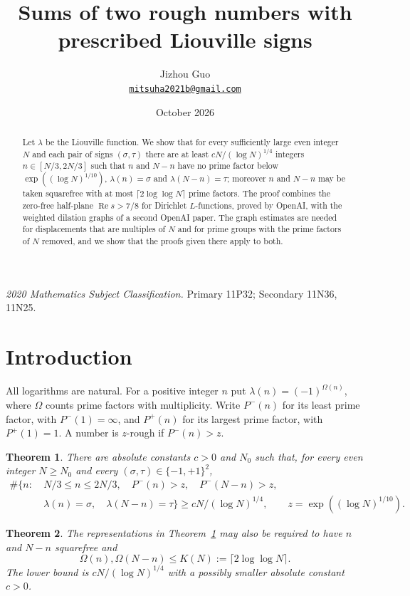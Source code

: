 \documentclass[11pt]{article}
\title{Sums of two rough numbers with prescribed Liouville signs}
\author{Jizhou Guo\\
  \href{mailto:mitsuha2021b@gmail.com}{\texttt{mitsuha2021b@gmail.com}}}
\date{October 2026}
\newtheorem{theorem}{Theorem}[section]
\theoremstyle{definition}
\theoremstyle{remark}
\begin{document}
\maketitle
\begin{abstract}
Let $\lambda$ be the Liouville function. We show that for every sufficiently large even integer $N$ and
each pair of signs $(\sigma,\tau)$ there are at least $cN/(\log N)^{1/4}$ integers $n\in[N/3,2N/3]$
such that $n$ and $N-n$ have no prime factor below $\exp((\log N)^{1/10})$, $\lambda(n)=\sigma$ and
$\lambda(N-n)=\tau$; moreover $n$ and $N-n$ may be taken squarefree with at most
$\lceil 2\log\log N\rceil$ prime factors. The proof combines the zero-free half-plane
$\operatorname{Re}s>7/8$ for Dirichlet $L$-functions, proved by OpenAI, with the weighted dilation
graphs of a second OpenAI paper. The graph estimates are needed for displacements that are multiples of
$N$ and for prime groups with the prime factors of $N$ removed, and we show that the proofs given
there apply to both.
\end{abstract}
\noindent\textit{2020 Mathematics Subject Classification.} Primary 11P32; Secondary 11N36, 11N25.

\section{Introduction}\label{sec:intro}
All logarithms are natural. For a positive integer $n$ put
$\lambda(n)=(-1)^{\Omega(n)}$, where $\Omega$ counts prime factors with
multiplicity. Write $P^-(n)$ for its least prime factor, with
$P^-(1)=\infty$, and $P^+(n)$ for its largest prime factor, with
$P^+(1)=1$. A number is $z$-rough if $P^-(n)>z$.

\begin{theorem}\label{thm:main}
There are absolute constants $c>0$ and $N_0$ such that, for every even
integer $N\ge N_0$ and every $(\sigma,\tau)\in\{-1,+1\}^2$,
\begin{equation}\label{eq:main}
\begin{split}
\#\{n:\ &N/3\le n\le 2N/3,\quad P^-(n)>z,\quad P^-(N-n)>z,\\
       &\lambda(n)=\sigma,\quad\lambda(N-n)=\tau\}
       \ge cN/(\log N)^{1/4},\qquad z=\exp((\log N)^{1/10}).
\end{split}
\end{equation}
\end{theorem}

\begin{theorem}\label{thm:postselection}
The representations in Theorem~\ref{thm:main} may also be required to have
$n$ and $N-n$ squarefree and
\begin{equation}\label{eq:factor-cutoff}
\Omega(n),\Omega(N-n)\le K(N):=\lceil2\log\log N\rceil.
\end{equation}
The lower bound is $cN/(\log N)^{1/4}$ with a possibly smaller absolute
constant $c>0$.
\end{theorem}
\end{document}
